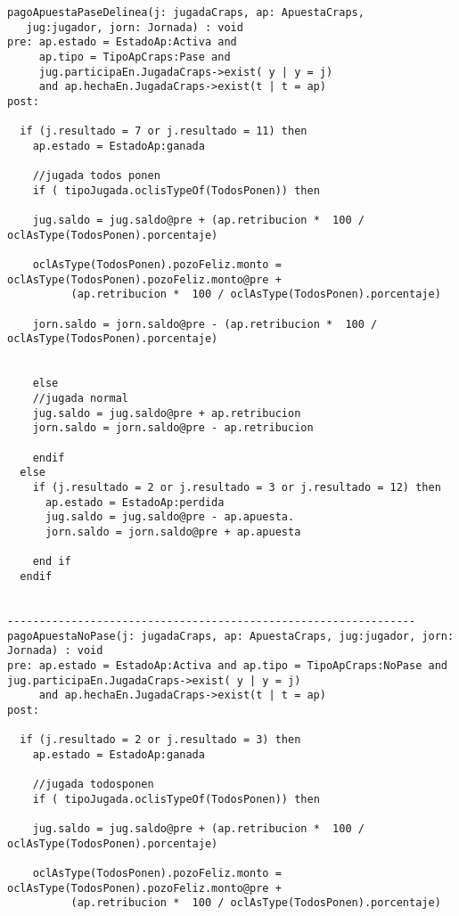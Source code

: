 
\begin{framed}
\begin{lstlisting}[breaklines=true]
pagoApuestaPaseDelinea(j: jugadaCraps, ap: ApuestaCraps, 
   jug:jugador, jorn: Jornada) : void
pre: ap.estado = EstadoAp:Activa and 
     ap.tipo = TipoApCraps:Pase and 
     jug.participaEn.JugadaCraps->exist( y | y = j) 
     and ap.hechaEn.JugadaCraps->exist(t | t = ap)
post:

  if (j.resultado = 7 or j.resultado = 11) then
    ap.estado = EstadoAp:ganada

    //jugada todos ponen
    if ( tipoJugada.oclisTypeOf(TodosPonen)) then 
    
    jug.saldo = jug.saldo@pre + (ap.retribucion *  100 / oclAsType(TodosPonen).porcentaje)
    
    oclAsType(TodosPonen).pozoFeliz.monto = oclAsType(TodosPonen).pozoFeliz.monto@pre + 
          (ap.retribucion *  100 / oclAsType(TodosPonen).porcentaje)

    jorn.saldo = jorn.saldo@pre - (ap.retribucion *  100 / oclAsType(TodosPonen).porcentaje)

    
    else
    //jugada normal
    jug.saldo = jug.saldo@pre + ap.retribucion
    jorn.saldo = jorn.saldo@pre - ap.retribucion

    endif
  else 
    if (j.resultado = 2 or j.resultado = 3 or j.resultado = 12) then
      ap.estado = EstadoAp:perdida
      jug.saldo = jug.saldo@pre - ap.apuesta.
      jorn.saldo = jorn.saldo@pre + ap.apuesta
  
    end if
  endif


----------------------------------------------------------------    
pagoApuestaNoPase(j: jugadaCraps, ap: ApuestaCraps, jug:jugador, jorn: Jornada) : void
pre: ap.estado = EstadoAp:Activa and ap.tipo = TipoApCraps:NoPase and jug.participaEn.JugadaCraps->exist( y | y = j) 
     and ap.hechaEn.JugadaCraps->exist(t | t = ap)
post:

  if (j.resultado = 2 or j.resultado = 3) then
    ap.estado = EstadoAp:ganada

    //jugada todosponen
    if ( tipoJugada.oclisTypeOf(TodosPonen)) then 
    
    jug.saldo = jug.saldo@pre + (ap.retribucion *  100 / oclAsType(TodosPonen).porcentaje)
    
    oclAsType(TodosPonen).pozoFeliz.monto = oclAsType(TodosPonen).pozoFeliz.monto@pre + 
          (ap.retribucion *  100 / oclAsType(TodosPonen).porcentaje)


\end{lstlisting}
\end{framed}
